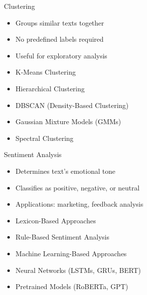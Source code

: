 \begin{frame}{Clustering}
\begin{multicols}{2}
\begin{itemize}
    \item Groups similar texts together
    \item No predefined labels required
    \item Useful for exploratory analysis
\end{itemize}

\vfill\null\columnbreak
\begin{itemize}
    \item K-Means Clustering
    \item Hierarchical Clustering
    \item DBSCAN (Density-Based Clustering)
    \item Gaussian Mixture Models (GMMs)
    \item Spectral Clustering
\end{itemize}
\end{multicols}
\end{frame}

\begin{frame}{Sentiment Analysis}
\begin{multicols}{2}
\begin{itemize}
    \item Determines text’s emotional tone
    \item Classifies as positive, negative, or neutral
    \item Applications: marketing, feedback analysis
\end{itemize}
\vfill\null\columnbreak
\begin{itemize}
    \item Lexicon-Based Approaches
    \item Rule-Based Sentiment Analysis
    \item Machine Learning-Based Approaches
    \item Neural Networks (LSTMs, GRUs, BERT)
    \item Pretrained Models (RoBERTa, GPT)
\end{itemize}
\end{multicols}
\end{frame}

